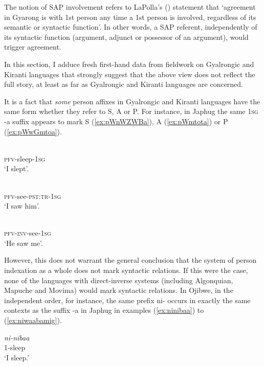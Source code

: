 \documentclass[oldfontcommands,oneside,a4paper,11pt]{article}
\newcommand{\ipa}[1]{{\phon \mbox{#1}}} %
\begin{document}
The notion of SAP involvement refers to LaPolla's (\citeyear[308]{lapolla92}) statement that `agreement in Gyarong is with 1st person any time a 1st person is involved, regardless of its semantic or syntactic function'. In other words, a SAP referent, independently of its syntactic function (argument, adjunct or possessor of an argument), would trigger agreement. 

In this section,  I adduce fresh first-hand data from fieldwork on Gyalrongic and Kiranti languages that strongly suggest that the above view does not reflect the full story, at least as far as Gyalrongic and Kiranti languages are concerned.

It is a fact that \textit{some} person affixes in Gyalrongic and Kiranti languages have the same form whether they refer to S, A or P. For instance, in Japhug the same \textsc{1sg} \ipa{-a} suffix appears to mark S (\ref{ex:pWnWZWBa}), A (\ref{ex:pWmtota}) or P (\ref{ex:pWwGmtoa}).

\begin{exe}
\ex \label{ex:pWnWZWBa}
\gll \ipa{pɯ-nɯʑɯβ-a} \\
\textsc{pfv}-sleep-\textsc{1sg} \\
\glt `I slept'.
\end{exe}

\begin{exe}
\ex \label{ex:pWmtota}
\gll \ipa{pɯ-mto-t-a} \\
\textsc{pfv}-see-\textsc{pst:tr}-\textsc{1sg} \\
\glt `I saw him'.
\end{exe}

\begin{exe}
\ex \label{ex:pWwGmtoa}
\gll \ipa{pɯ́-wɣ-mto-a} \\
\textsc{pfv}-\textsc{inv}-see-\textsc{1sg} \\
\glt `He saw me'.
\end{exe}

However, this does not warrant the general conclusion that  the system of person indexation as a whole does not mark syntactic relations. If this were the case, none of the languages with direct-inverse systems (including Algonquian, Mapuche and Movima) would mark syntactic relations. In Ojibwe, in the independent order, for instance, the same prefix \ipa{ni-} occurs in exactly the same contexts as the suffix \ipa{-a} in Japhug in examples (\ref{ex:ninibaa}) to (\ref{ex:niwaabamig}). 

\begin{exe}
\ex  \label{ex:ninibaa}
\gll \textit{ni-nibaa} \\
1-sleep  \\
\glt `I sleep.'
\end{exe} 
\end{document}
